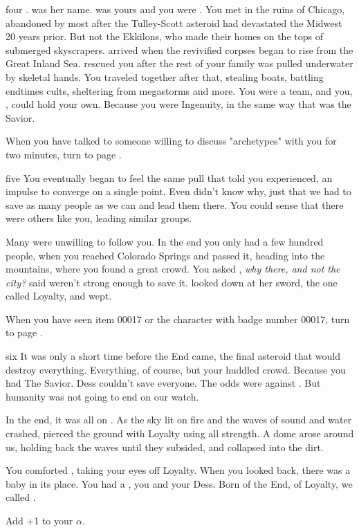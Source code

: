 \documentclass[greennotebook]{Silversiders} %
\begin{document}
\begin{page}{four}
\emph{\cSavior{}}. \cSavior{\intro} was her name. \cSavior{\They} was yours and you were \cIngenuity{\theirs}. You met \cSavior{\them} in the ruins of Chicago, abandoned by most after the Tulley-Scott asteroid had devastated the Midwest 20 years prior. But not the Ekkilons, who made their homes on the tops of submerged skyscrapers. \cSavior{\They} arrived when the revivified corpses began to rise from the Great Inland Sea. \cSavior{} rescued you after the rest of your family was pulled underwater by skeletal hands. You traveled together after that, stealing boats, battling endtimes cults, sheltering from megastorms and more. You were a team, and you, \cIngenuityOld{}, could hold your own. Because you were Ingenuity, in the same way that \cSavior{\they} was the Savior.

When you have talked to someone willing to discuss "archetypes" with you for two minutes, turn to page .
\end{page}

\begin{page}{five}
You eventually began to feel the same pull that \cSavior{} told you \cSavior{\they} experienced, an impulse to converge on a single point. Even \cSavior{\they} didn't know why, just that we had to save as many people as we can and lead them there. You could sense that there were others like you, leading similar groups. 

Many were unwilling to follow you. In the end you only had a few hundred people, when you reached Colorado Springs and passed it, heading into the mountains, where you found a great crowd. You asked \cSavior{\them}, \emph{why there, and not the city?} \cSavior{\They} said \cSavior{\they} weren't strong enough to save it. \cSavior{\They} looked down at her sword, the one \cSavior{\they} called Loyalty, and wept.

When you have seen item 00017 or the character with badge number 00017, turn to page .
\end{page}

\begin{page}{six}
It was only a short time before the End came, the final asteroid that would destroy everything. Everything, of course, but your huddled crowd. Because you had The Savior. Dess couldn't save everyone. The odds were against \cSavior{\them}. But humanity was not going to end on our watch.

In the end, it was all on \cSavior{\them}. As the sky lit on fire and the waves of sound and water crashed, \cSavior{\they} pierced the ground with Loyalty using all \cSavior{\their} strength. A dome arose around us, holding back the waves until they subsided, and \cSavior{\they} collapsed into the dirt.

You comforted \cSavior{\them}, taking your eyes off Loyalty. When you looked back, there was a baby in its place. You had a \cLoyalty{\offspring}, you and your Dess. Born of the End, of Loyalty, we called \cLoyalty{\them} \cLoyalty{\intro}.

Add +1 to your $\alpha$.
\end{page}

\endnotebook
\end{document}
